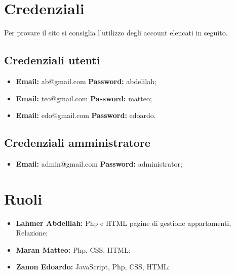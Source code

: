 \documentclass[12pt]{article}
\begin{document}
\newpage
\section{Credenziali}
Per provare il sito si consiglia l'utilizzo degli account elencati in seguito.
\subsection{Credenziali utenti}
\begin{itemize}
\item \textbf{Email:} ab@gmail.com \textbf{Password:} abdelilah;
\item \textbf{Email:} teo@gmail.com \textbf{Password:} matteo;
\item \textbf{Email:} edo@gmail.com \textbf{Password:} edoardo.
\end{itemize}
\subsection{Credenziali amministratore}
\begin{itemize}
\item \textbf{Email:} admin@gmail.com \textbf{Password:} administrator;
\end{itemize}

\section{Ruoli}
\begin{itemize}
\item \textbf{Lahmer Abdelilah:} Php e HTML pagine di gestione appartamenti, Relazione;
\item \textbf{Maran Matteo:} Php, CSS, HTML;
\item \textbf{Zanon Edoardo:} JavaScript, Php, CSS, HTML;
\end{itemize}
\end{document}

